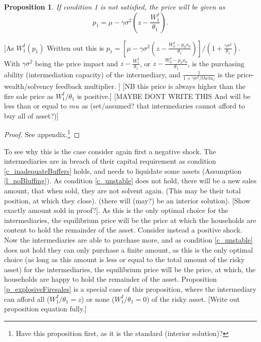 \documentclass[11pt]{article}
\newtheorem{proposition}{Proposition}
\begin{document}
\begin{proposition} \label{p_pricewoExplosive}
If condition 1 is not satisfied, the price will be given as 
\begin{equation}
p_1 = \mu - \gamma\sigma^2 \left(z-\frac{W^I_1}{\theta_1}\right).
\end{equation}
\end{proposition}
[As $W_1^I(p_1)$ Written out this is $p_1 = \left[\mu - \gamma\sigma^2 \left(z - \frac{W_0^I - p_0 x_0}{\theta_1}\right)\right]/(1+\frac{\gamma\sigma^2}{\theta_1}) $. With $\gamma\sigma^2$ being the price impact and $z-\frac{W^I_1}{\theta_1}$, or $z - \frac{W_0^I - p_0 x_0}{\theta_1}$, is the purchasing ability (intermediation capacity) of the intermediary, and $\frac{1}{1 + \gamma\sigma^2/theta_1}$ is the price-wealth/solvency feedback multiplier. ] [NB this price is always higher than the fire sale price as $W^I_1/\theta_1$ is positive.] [MAYBE DONT WRITE THIS And will be less than or equal to $mu$ as (set/assumed? that intermedaries cannot afford to buy all of asset?)]
\begin{proof}
See appendix.\footnote{Have this proposition first, as it is the standard (interior solution)?}
\end{proof}

To see why this is the case consider again first a negative shock. The intermediaries are in breach of their capital requirement as condition \ref{c_inadequateBuffers} holds, and needs to liquidate some assets (Assumption \ref{l_noBluffing}). As condition \ref{c_unstable} does not hold, there will be a new sales amount, that when sold, they are not solvent again. (This may be their total position, at which they close). (there will (may?) be an interior solution). [Show exactly amount sold in proof?]. As this is the only optimal choice for the intermediaries, the equilibrium price will be the price at which the households are content to hold the remainder of the asset. Consider instead a positive shock. Now the intermediaries are able to purchase more, and as condition \ref{c_unstable} does not hold they can only purchase a finite amount, as this is the only optimal choice (as long as this amount is less or equal to the total amount of the risky asset) for the intermediaries, the equilibrium price will be the price, at which, the households are happy to hold the remainder of the asset. Proposition \ref{p_explosiveFiresales} is a special case of this proposition, where the intermediary can afford all ($W^I_1/\theta_1 = z$) or none ($W^I_1/\theta_1 = 0$) of the risky asset. [Write out proposition equation fully.]
\end{document}
